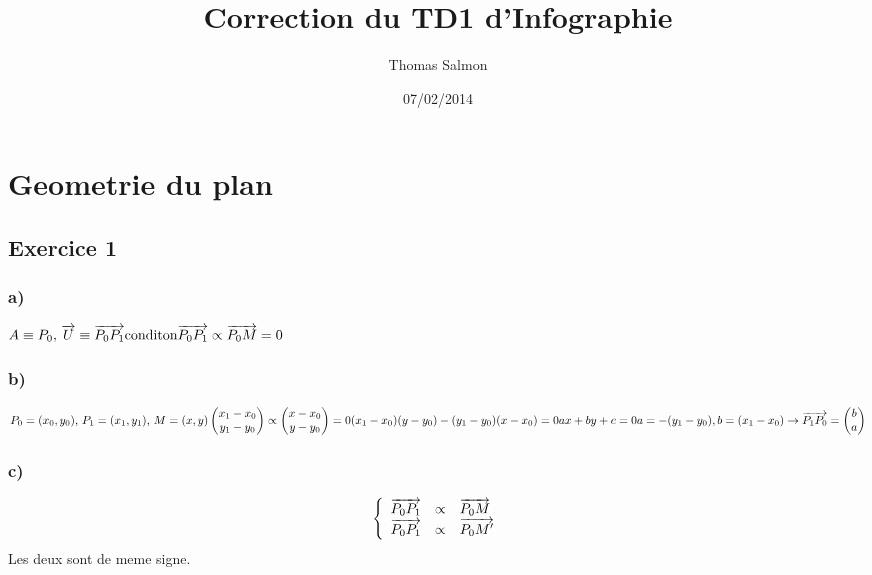 \documentclass[a4paper]{article}
\title{Correction du TD1 d'Infographie}
\author{Thomas Salmon}
\date{07/02/2014}
\begin{document}
\maketitle
\section{Geometrie du plan}
\subsection{Exercice 1}
\subsubsection{a)}
\begin{math}  
  A \equiv P_0$, $ \overrightarrow{U} \equiv \overrightarrow{P_0P_1} \\  
  $conditon$ \overrightarrow{P_0 P_1} \propto \overrightarrow{P_0M} = 0
\end{math}
\subsubsection{b)}
\begin{math}
  P_0 = (x_0, y_0)$, $ P_1 = (x_1, y_1)$, $ M = (x, y) \\
  \begin{pmatrix}
    x_1 - x_0\\
    y_1 - y_0
  \end{pmatrix}
  \propto
  \begin{pmatrix}
    x - x_0\\
    y - y_0
  \end{pmatrix}
  = 0 \\
  (x_1 - x_0)(y - y_0) - (y_1 - y_0)(x - x_0) = 0 \\
  ax + by + c = 0 \\
  \\
  a = -(y_1 - y_0), b = (x_1 - x_0)\\
  \rightarrow \overrightarrow{P_1P_0} =  
  \begin{pmatrix}
    b\\
    a
  \end{pmatrix}
\end{math}
\subsubsection{c)}
\[ 
\left\{
\begin{array}{r c l}
  \overrightarrow{P_0P_1} & \propto & \overrightarrow{P_0M} \\
  \overrightarrow{P_0P_1} & \propto & \overrightarrow{P_0M'}
\end{array}
\right .
\]
Les deux sont de meme signe.
\end{document}
